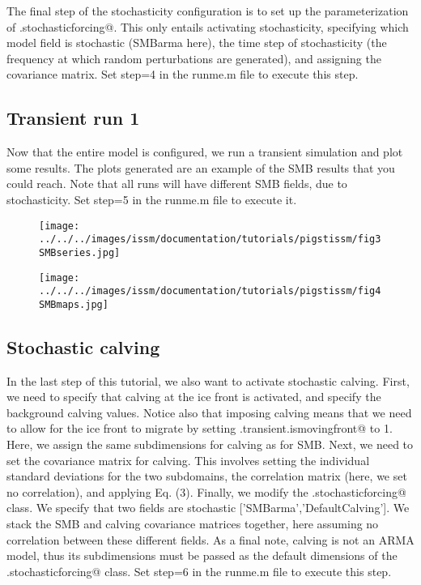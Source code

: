 The final step of the stochasticity configuration is to set up the parameterization of \verb@md.stochasticforcing@. This only entails activating stochasticity, specifying which model field is stochastic (SMBarma here), the time step of stochasticity (the frequency at which random perturbations are generated), and assigning the covariance matrix.
Set step=4 in the runme.m file to execute this step.

\subsection{Transient run 1}%
Now that the entire model is configured, we run a transient simulation and plot some results. The plots generated are an example of the SMB results that you could reach. Note that all runs will have different SMB fields, due to stochasticity. Set step=5 in the runme.m file to execute it.
\begin{figure}
	\begin{center}
		\texttt{[image: ../../../images/issm/documentation/tutorials/pigstissm/fig3SMBseries.jpg]}
	\end{center}
\end{figure}
\begin{figure}
	\begin{center}
		\texttt{[image: ../../../images/issm/documentation/tutorials/pigstissm/fig4SMBmaps.jpg]}
	\end{center}
\end{figure}

\subsection{Stochastic calving}%
In the last step of this tutorial, we also want to activate stochastic calving. First, we need to specify that calving at the ice front is activated, and specify the background calving values. Notice also that imposing calving means that we need to allow for the ice front to migrate by setting \verb@md.transient.ismovingfront@ to 1.
Here, we assign the same subdimensions for calving as for SMB. Next, we need to set the covariance matrix for calving. This involves setting the individual standard deviations for the two subdomains, the correlation matrix (here, we set no correlation), and applying Eq. (3). Finally, we modify the \verb@md.stochasticforcing@ class. We specify that two fields are stochastic [{'SMBarma'},{'DefaultCalving'}]. We stack the SMB and calving covariance matrices together, here assuming no correlation between these different fields. As a final note, calving is not an ARMA model, thus its subdimensions must be passed as the default dimensions of the \verb@md.stochasticforcing@ class.
Set step=6 in the runme.m file to execute this step.

